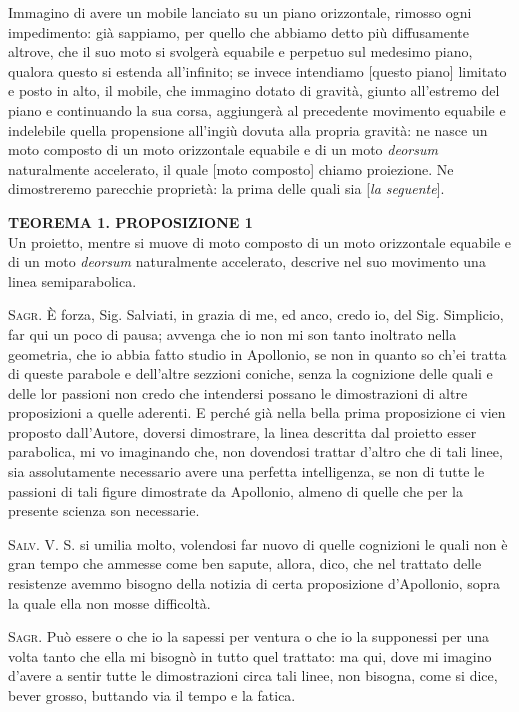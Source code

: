 \documentclass[11pt,twoside,openany]{book}
\newcommand{\speaker}[1]{\textcolor{rubric}{\textsc{#1}}\space}
\begin{document}
Immagino di avere un mobile lanciato su un piano orizzontale, rimosso ogni impedimento: già sappiamo, per quello che abbiamo detto più diffusamente altrove, che il suo moto si svolgerà equabile e perpetuo sul medesimo piano, qualora questo si estenda all'infinito; se invece intendiamo [questo piano] limitato e posto in alto, il mobile, che immagino dotato di gravità, giunto all'estremo del piano e continuando la sua corsa, aggiungerà al precedente movimento equabile e indelebile quella propensione all'ingiù dovuta alla propria gravità: ne nasce un moto composto di un moto orizzontale equabile e di un moto \emph{deorsum} naturalmente accelerato, il quale [moto composto] chiamo proiezione. Ne dimostreremo parecchie proprietà: la prima delle quali sia [\emph{la seguente}].

\textbf{TEOREMA 1. PROPOSIZIONE 1}\\ Un proietto, mentre si muove di moto composto di un moto orizzontale equabile e di un moto \emph{deorsum} naturalmente accelerato, descrive nel suo movimento una linea semiparabolica.

\speaker{Sagr.} È forza, Sig. Salviati, in grazia di me, ed anco, credo io, del Sig. Simplicio, far qui un poco di pausa; avvenga che io non mi son tanto inoltrato nella geometria, che io abbia fatto studio in Apollonio, se non in quanto so ch'ei tratta di queste parabole e dell'altre sezzioni coniche, senza la cognizione delle quali e delle lor passioni non credo che intendersi possano le dimostrazioni di altre proposizioni a quelle aderenti. E perché già nella bella prima proposizione ci vien proposto dall'Autore, doversi dimostrare, la linea descritta dal proietto esser parabolica, mi vo imaginando che, non dovendosi trattar d'altro che di tali linee, sia assolutamente necessario avere una perfetta intelligenza, se non di tutte le passioni di tali figure dimostrate da Apollonio, almeno di quelle che per la presente scienza son necessarie.

\speaker{Salv.} V. S. si umilia molto, volendosi far nuovo di quelle cognizioni le quali non è gran tempo che ammesse come ben sapute, allora, dico, che nel trattato delle resistenze avemmo bisogno della notizia di certa proposizione d'Apollonio, sopra la quale ella non mosse difficoltà.

\speaker{Sagr.} Può essere o che io la sapessi per ventura o che io la supponessi per una volta tanto che ella mi bisognò in tutto quel trattato: ma qui, dove mi imagino d'avere a sentir tutte le dimostrazioni circa tali linee, non bisogna, come si dice, bever grosso, buttando via il tempo e la fatica.
\end{document}
